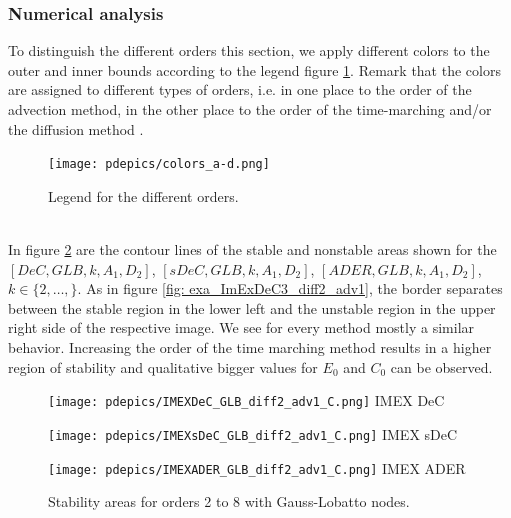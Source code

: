\subsubsection{Numerical analysis}
To distinguish the different orders this section, we apply different colors to the outer and inner bounds according to the legend figure \ref{fig: legend_a-d}. Remark that the colors are assigned to different types of orders, i.e. in one place to the order of the advection method, in the other place to the order of the time-marching and/or the diffusion method .
\begin{figure}[!h]
	\centering
	\texttt{[image: pdepics/colors\_a-d.png]}
	\caption{Legend for the different orders.}
	\label{fig: legend_a-d}
\end{figure}\\
In figure \ref{fig: grp_adv1_diff2_GLB} are the contour lines of the stable and nonstable areas shown for the \\ $[DeC,GLB,k, A_1,D_2]$, $[sDeC,GLB,k, A_1,D_2]$, $[ADER,GLB,k, A_1,D_2]$, $k \in \{2,\hdots ,\}$. As in figure \ref{fig: exa_ImExDeC3_diff2_adv1}, the border separates between the stable region in the lower left and the unstable region in the upper right side of the respective image. We see for every method mostly a similar behavior. Increasing the order of the time marching method results in a higher region of stability and qualitative bigger values for $E_0$ and $C_0$ can be observed. 

\begin{figure}[!h]
	\centering
	\begin{minipage}[t]{0.32\textwidth}
		\texttt{[image: pdepics/IMEXDeC\_GLB\_diff2\_adv1\_C.png]}
		\centering
		IMEX DeC
	\end{minipage} 
	\begin{minipage}[t]{0.32\textwidth}
		\texttt{[image: pdepics/IMEXsDeC\_GLB\_diff2\_adv1\_C.png]}
		\centering
		IMEX sDeC
	\end{minipage}
	\begin{minipage}[t]{0.32\textwidth}
		\texttt{[image: pdepics/IMEXADER\_GLB\_diff2\_adv1\_C.png]}
		\centering
		IMEX ADER
	\end{minipage} 
	\caption{Stability areas for orders 2 to 8 with Gauss-Lobatto nodes.}
	\label{fig: grp_adv1_diff2_GLB}
\end{figure}



